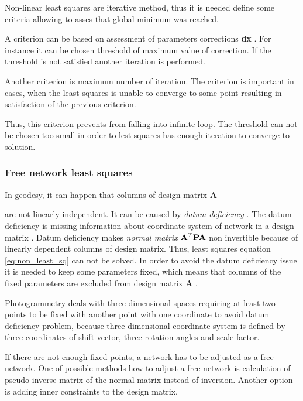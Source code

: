 \documentclass[a4paper,12pt]{article}
\newcommand{\ematr}[1]{
{\bf #1}
}
\newcommand{\evect}[1]{
{\bf #1}
}
\newcommand{\term}[1]{
{\it #1}%
}
\begin{document}
Non-linear least squares are iterative method, thus it is needed define 
some criteria allowing to asses that global minimum was reached. 

A criterion \cite{mikhail1976observations} can be 
based on assessment of parameters corrections \evect{dx}. 
For instance it can be chosen threshold of maximum value
of correction. If the threshold is not satisfied another 
iteration is performed. 

Another criterion is maximum number of iteration.
The criterion is important in cases, when the least squares 
is unable to converge to some point resulting 
in satisfaction of the previous criterion.

Thus, this criterion prevents from falling into infinite loop.
The threshold can not be chosen too small in order to
lest squares has enough iteration to converge to solution. 


\subsubsection{Free network least squares}
\label{sec:free_net_least}


In geodesy, it can happen that columns of design matrix \ematr{A}
are not linearly independent. It can be caused by \term{datum deficiency} \cite{deakin2006rank}. 
The datum deficiency is missing information
about  coordinate system of network in a design matrix \cite{strang1997linear}.
Datum deficiency makes \term{normal matrix} $ \ematr{A}^{T} \ematr{P} \ematr{A}$ non invertible because 
of linearly dependent columns of design matrix. 
Thus,
least squares equation \eqref{eq:non_least_sq} can not be solved.
In order to avoid the datum deficiency issue it is needed to keep some parameters fixed,
which means that columns of the fixed parameters are excluded from design matrix\ematr{A}.

Photogrammetry deals with three dimensional spaces requiring at least  
two points to be fixed with another point with one coordinate to avoid datum deficiency problem, because
three dimensional coordinate system is defined by three coordinates of shift vector, three rotation angles and scale factor. 

If there are not enough fixed points, a network has to be adjusted as a free network.
One of possible methods how to adjust a free network is calculation of pseudo inverse matrix of the normal matrix instead of
inversion. Another option is adding inner constraints to the design matrix.
\end{document}
